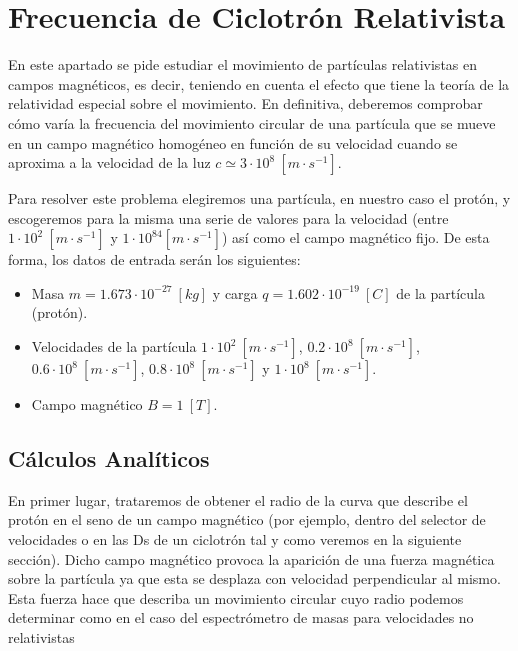 \documentclass[journal]{IEEEtran}
\begin{document}
\newpage

\section{Frecuencia de Ciclotrón Relativista}
\label{sec:frecuencia}

En este apartado se pide estudiar el movimiento de partículas relativistas en campos
magnéticos, es decir, teniendo en cuenta el efecto que tiene la teoría de la relatividad
especial sobre el movimiento. En definitiva, deberemos comprobar cómo varía la frecuencia del movimiento circular de una partícula que se mueve en un campo magnético homogéneo en función de su velocidad cuando se aproxima a la velocidad de la luz $c \simeq 3\cdot 10^8~[m\cdot s^{-1}]$.

Para resolver este problema elegiremos una partícula, en nuestro caso el protón, y escogeremos para la misma una serie de valores para la velocidad (entre $1\cdot 10^2~[m\cdot s^{-1}]$ y $1\cdot 10^84[m\cdot s^{-1}]$) así como el campo magnético fijo. De esta forma, los datos de entrada serán los siguientes:

\begin{itemize}
    \item Masa $m = 1.673\cdot 10^{-27}~[kg]$ y carga $q = 1.602\cdot 10^{-19}~[C]$ de la partícula (protón).
    \item Velocidades de la partícula $1\cdot 10^2~[m\cdot s^{-1}]$, $0.2\cdot 10^8~[m\cdot s^{-1}]$, $0.6\cdot 10^8~[m\cdot s^{-1}]$, $0.8\cdot 10^8~[m\cdot s^{-1}]$ y $1\cdot 10^8~[m\cdot s^{-1}]$.
    \item Campo magnético $B = 1~[T]$.
\end{itemize}

\subsection{Cálculos Analíticos}

En primer lugar, trataremos de obtener el radio de la curva que describe el protón en el seno de un campo magnético (por ejemplo, dentro del selector de velocidades o en las Ds de un ciclotrón tal y como veremos en la siguiente sección). Dicho campo magnético provoca la aparición de una fuerza magnética sobre la partícula ya que esta se desplaza con velocidad perpendicular al mismo. Esta fuerza hace que describa un movimiento circular cuyo radio podemos determinar como en el caso del espectrómetro de masas para velocidades no relativistas
\end{document}
